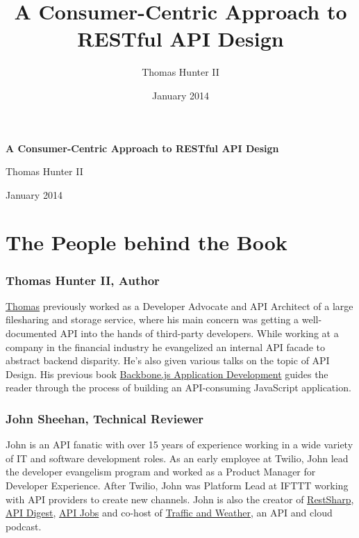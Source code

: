 \documentclass{book}
\title{A Consumer-Centric Approach to RESTful API Design}
\author{Thomas Hunter II}
\date{January 2014}
\begin{document}
\thispagestyle{empty}
\begin{center}

\LARGE{\textbf{A Consumer-Centric Approach to RESTful API Design}}

\null
\vfill

\Large{Thomas Hunter II}

\large{January 2014}

\end{center}

\newpage
\restoregeometry

\section*{The People behind the Book}

\subsubsection*{Thomas Hunter II, Author}

\href{http://thomashunter.name}{Thomas} previously worked as a Developer Advocate and API Architect of a large filesharing and storage service, where his main concern was getting a well-documented API into the hands of third-party developers. While working at a company in the financial industry he evangelized an internal API facade to abstract backend disparity. He's also given various talks on the topic of API Design. His previous book \href{http://amzn.to/1aqVRvq}{Backbone.js Application Development} guides the reader through the process of building an API-consuming JavaScript application.

\subsubsection*{John Sheehan, Technical Reviewer}

John is an API fanatic with over 15 years of experience working in a wide variety of IT and software development roles. As an early employee at Twilio, John lead the developer evangelism program and worked as a Product Manager for Developer Experience. After Twilio, John was Platform Lead at IFTTT working with API providers to create new channels. John is also the creator of \href{https://www.github.com/restsharp/restsharp}{RestSharp}, \href{http://www.apidigest.com/}{API Digest}, \href{http://www.api-jobs.com/}{API Jobs} and co-host of \href{http://trafficandweather.io/}{Traffic and Weather}, an API and cloud podcast.
\end{document}
